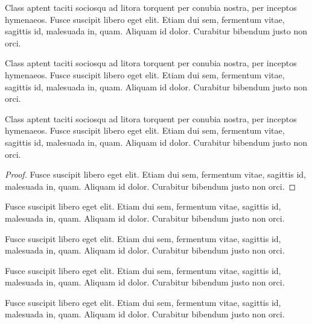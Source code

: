 \begin{definition}
  Class aptent taciti sociosqu ad litora torquent per conubia nostra, per inceptos hymenaeos. Fusce suscipit libero eget elit. Etiam dui sem, fermentum vitae, sagittis id, malesuada in, quam. Aliquam id dolor. Curabitur bibendum justo non orci.
\end{definition}

\begin{example}
  Class aptent taciti sociosqu ad litora torquent per conubia nostra, per inceptos hymenaeos. Fusce suscipit libero eget elit. Etiam dui sem, fermentum vitae, sagittis id, malesuada in, quam. Aliquam id dolor. Curabitur bibendum justo non orci.
\end{example}

\begin{theorem}
  Class aptent taciti sociosqu ad litora torquent per conubia nostra, per inceptos hymenaeos. Fusce suscipit libero eget elit. Etiam dui sem, fermentum vitae, sagittis id, malesuada in, quam. Aliquam id dolor. Curabitur bibendum justo non orci.
\end{theorem}

\begin{proof}
  Fusce suscipit libero eget elit. Etiam dui sem, fermentum vitae, sagittis id, malesuada in, quam. Aliquam id dolor. Curabitur bibendum justo non orci.
\end{proof}

\begin{corollary}
  Fusce suscipit libero eget elit. Etiam dui sem, fermentum vitae, sagittis id, malesuada in, quam. Aliquam id dolor. Curabitur bibendum justo non orci.
\end{corollary}

\begin{proposition}
  Fusce suscipit libero eget elit. Etiam dui sem, fermentum vitae, sagittis id, malesuada in, quam. Aliquam id dolor. Curabitur bibendum justo non orci.
\end{proposition}

\begin{note}
  Fusce suscipit libero eget elit. Etiam dui sem, fermentum vitae, sagittis id, malesuada in, quam. Aliquam id dolor. Curabitur bibendum justo non orci.
\end{note}

\begin{remark}
  Fusce suscipit libero eget elit. Etiam dui sem, fermentum vitae, sagittis id, malesuada in, quam. Aliquam id dolor. Curabitur bibendum justo non orci.
\end{remark}

